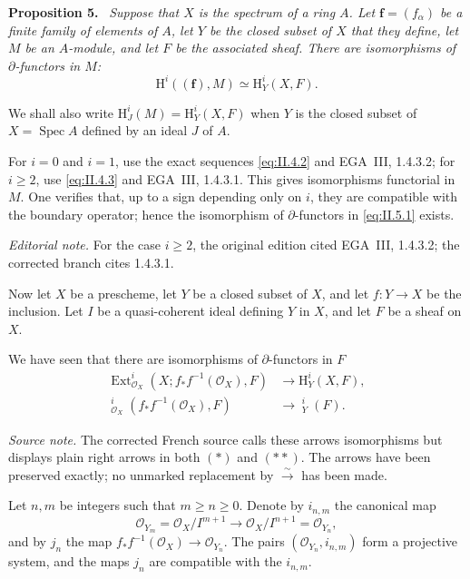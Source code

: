 \documentclass[11pt,a4paper,oneside]{book}
\providecommand{\srcpage}[1]{%
  \marginpar{\raggedright\scriptsize\color{gray}Original French p.~#1}}
\providecommand{\ffam}{\mathbf f}
\providecommand{\uExt}{\mathop{\underline{\mathrm{Ext}}}\nolimits}
\providecommand{\uH}{\mathop{\underline{\mathrm H}}\nolimits}
\providecommand{\OX}{\mathcal O_X}
\providecommand{\Spec}{\operatorname{Spec}}
\providecommand{\Ext}{\operatorname{Ext}}
\newenvironment{sgastatement}[1]
  {\par\addvspace{0.8\baselineskip}\noindent\textbf{#1.}\ \itshape}
  {\par\addvspace{0.35\baselineskip}}
\theoremstyle{plain}
\theoremstyle{definition}
\theoremstyle{remark}
\begin{document}
\begin{sgastatement}{Proposition 5}
Suppose that $X$ is the spectrum of a ring $A$. Let
$\ffam=(f_\alpha)$ be a finite family of elements of $A$, let $Y$ be the
closed subset of $X$ that they define, let $M$ be an $A$-module, and let $F$
be the associated sheaf. There are isomorphisms of $\partial$-functors in
$M$:
\begin{equation}
  \mathrm H^i((\ffam),M)\simeq \mathrm H_Y^i(X,F).
  \tag{5.1}\label{eq:II.5.1}
\end{equation}
\end{sgastatement}

We shall also write
$\mathrm H_J^i(M)=\mathrm H_Y^i(X,F)$ when $Y$ is the closed subset of
$X=\Spec A$ defined by an ideal $J$ of $A$.

For $i=0$\srcpage{21} and $i=1$, use the exact sequences
\eqref{eq:II.4.2} and EGA~III, 1.4.3.2; for $i\geq2$, use
\eqref{eq:II.4.3} and EGA~III, 1.4.3.1. This gives isomorphisms functorial in
$M$. One verifies that, up to a sign depending only on $i$, they are
compatible with the boundary operator; hence the isomorphism of
$\partial$-functors in \eqref{eq:II.5.1} exists.

\noindent\textit{Editorial note.} For the case $i\geq2$, the original
edition cited EGA~III, 1.4.3.2; the corrected branch cites 1.4.3.1.

Now let $X$ be a prescheme, let $Y$ be a closed subset of $X$, and let
$f\colon Y\to X$ be the inclusion. Let $I$ be a quasi-coherent ideal defining
$Y$ in $X$, and let $F$ be a sheaf on $X$.

We have seen that there are isomorphisms of $\partial$-functors in $F$
\begin{align}
  \Ext_{\OX}^i(X;f_*f^{-1}(\OX),F)
    &\longrightarrow \mathrm H_Y^i(X,F),
    \tag{$*$}\label{eq:II.5.*}\\
  \uExt_{\OX}^i(f_*f^{-1}(\OX),F)
    &\longrightarrow \uH_Y^i(F).
    \tag{$**$}\label{eq:II.5.**}
\end{align}

\noindent\textit{Source note.} The corrected French source calls these
arrows isomorphisms but displays plain right arrows in both $(*)$ and $(**)$.
The arrows have been preserved exactly; no unmarked replacement by
$\xrightarrow{\sim}$ has been made.

Let $n,m$ be integers such that $m\geq n\geq0$. Denote by $i_{n,m}$ the
canonical map
\[
  \mathcal O_{Y_m}=\OX/I^{m+1}
  \longrightarrow \OX/I^{n+1}=\mathcal O_{Y_n},
\]
and by $j_n$ the map
$f_*f^{-1}(\OX)\to\mathcal O_{Y_n}$. The pairs
$(\mathcal O_{Y_n},i_{n,m})$ form a projective system, and the maps $j_n$ are
compatible with the $i_{n,m}$.
\end{document}

